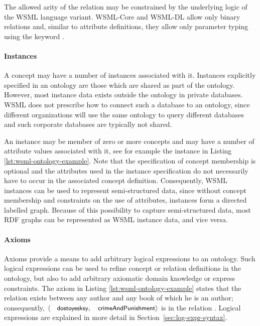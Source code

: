 The allowed arity of the relation may be constrained by the
underlying logic of the WSML language variant. WSML-Core and WSML-DL
allow only binary relations and, similar to attribute definitions,
they allow only parameter typing using the keyword
.


\paragraph{Instances}
A concept may have a number of instances associated with it.
Instances explicitly specified in an ontology are those which are
shared as part of the ontology. However, most instance data exists
outside the ontology in private databases. WSML does not prescribe
how to connect such a database to an ontology, since different
organizations will use the same ontology to query different
databases and such corporate databases are typically not shared.

An instance may be member of zero or more concepts and may have a
number of attribute values associated with it, see for example the
instance  in Listing
\ref{lst:wsml-ontology-example}. Note that the specification of
concept membership is optional and the attributes used in the
instance specification do not necessarily have to occur in the
associated concept definition. Consequently, WSML instances can be
used to represent semi-structured data, since without concept
membership and constraints on the use of attributes, instances form
a directed labelled graph. Because of this possibility to capture
semi-structured data, most RDF graphs can be represented as WSML
instance data, and vice versa.


\paragraph{Axioms} Axioms provide a means to add arbitrary logical
expressions to an ontology. Such logical expressions can be used to
refine concept or relation definitions in the ontology, but also to
add arbitrary axiomatic domain knowledge or express constraints. The
axiom  in Listing
\ref{lst:wsml-ontology-example} states that the relation
 exists between any author and any book of which he
is an author; consequently, $\langle \syn{dostoyesksy},
\syn{crimeAndPunishment} \rangle$ is in the relation
. Logical expressions are explained in more detail
in Section~\ref{sec:log-expr-syntax}.

